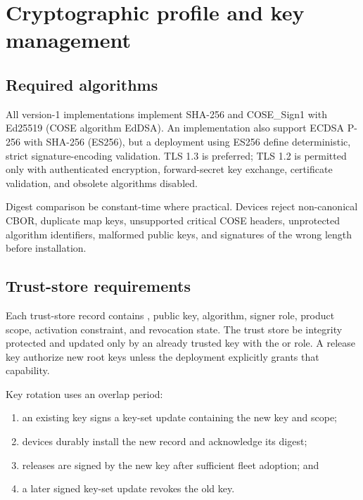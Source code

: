 \section{Cryptographic profile and key management}
\label{sec:crypto}

\subsection{Required algorithms}

All version-1 implementations \must implement SHA-256 and COSE\_Sign1 with
Ed25519 (COSE algorithm EdDSA). An implementation \may also support ECDSA P-256
with SHA-256 (ES256), but a deployment using ES256 \must define deterministic,
strict signature-encoding validation. TLS 1.3 is preferred; TLS 1.2 is permitted
only with authenticated encryption, forward-secret key exchange, certificate
validation, and obsolete algorithms disabled.

Digest comparison \must be constant-time where practical. Devices \must reject
non-canonical CBOR, duplicate map keys, unsupported critical COSE headers,
unprotected algorithm identifiers, malformed public keys, and signatures of the
wrong length before installation.

\subsection{Trust-store requirements}

Each trust-store record contains , public key, algorithm, signer
role, product scope, activation constraint, and revocation state. The trust store
\must be integrity protected and updated only by an already trusted key with the
 or  role. A release key \mustnot authorize new
root keys unless the deployment explicitly grants that capability.

Key rotation uses an overlap period:

\begin{enumerate}
  \item an existing key signs a key-set update containing the new key and scope;
  \item devices durably install the new record and acknowledge its digest;
  \item releases are signed by the new key after sufficient fleet adoption; and
  \item a later signed key-set update revokes the old key.
\end{enumerate}

